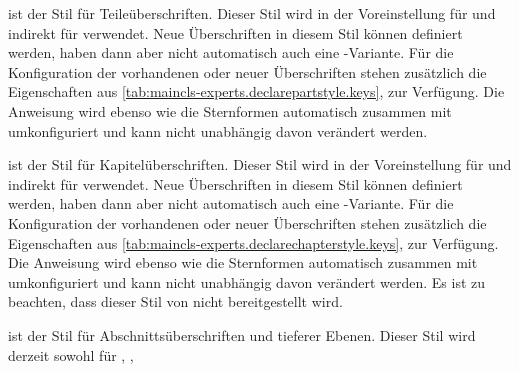 \begin{description}
\item[\PValue{part}] ist der
  Stil für
  Teileüberschriften. Dieser Stil wird in der Voreinstellung für
   und indirekt für
   verwendet. Neue
  Überschriften in diesem Stil können definiert werden, haben dann aber nicht
  automatisch auch eine -Variante. Für die Konfiguration der
  vorhandenen oder neuer Überschriften stehen zusätzlich die Eigenschaften aus
  \autoref{tab:maincls-experts.declarepartstyle.keys},
   zur
  Verfügung. Die Anweisung 
  wird ebenso wie die Sternformen automatisch zusammen mit
   umkonfiguriert und kann nicht unabhängig davon
  verändert werden.
\item[\PValue{chapter}] ist der Stil für
  Kapitelüberschriften. Dieser Stil wird in der Voreinstellung für
   und indirekt für
   verwendet. Neue
  Überschriften in diesem Stil können definiert werden, haben dann aber nicht
  automatisch auch eine -Variante. Für die Konfiguration der
  vorhandenen oder neuer Überschriften stehen zusätzlich die Eigenschaften aus
  \autoref{tab:maincls-experts.declarechapterstyle.keys},
   zur
  Verfügung. Die Anweisung 
  wird ebenso wie die Sternformen automatisch zusammen mit
   umkonfiguriert und kann nicht unabhängig davon
  verändert werden. Es ist zu beachten, dass dieser Stil von
   nicht
  bereitgestellt wird.
\item[\PValue{section}] ist der Stil für
  Abschnittsüberschriften und tieferer Ebenen. Dieser Stil wird derzeit sowohl
  für ,
  ,

\end{description}
